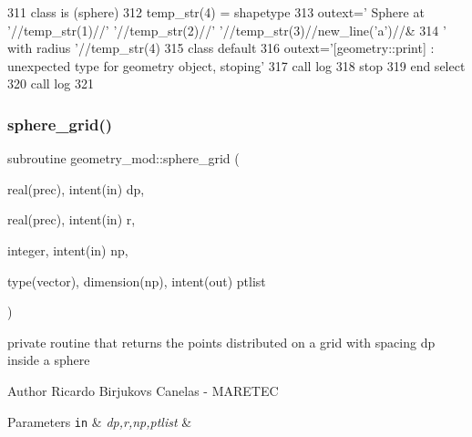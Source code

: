 \begin{DoxyCode}
311 \textcolor{keywordflow}{    class is} (sphere)
312         temp\_str(4) = shapetype%
313         outext=\textcolor{stringliteral}{'      Sphere at '}//temp\_str(1)//\textcolor{stringliteral}{' '}//temp\_str(2)//\textcolor{stringliteral}{' '}//temp\_str(3)//new\_line(\textcolor{stringliteral}{'a'})//&
314             \textcolor{stringliteral}{'       with radius '}//temp\_str(4)
315 \textcolor{keywordflow}{        class default}
316         outext=\textcolor{stringliteral}{'[geometry::print] : unexpected type for geometry object, stoping'}
317         \textcolor{keyword}{call }log%
318         stop
319 \textcolor{keywordflow}{    end select}
320     \textcolor{keyword}{call }log%
321 
\end{DoxyCode}
\mbox{\label{namespacegeometry__mod_a6c03a4ea3de6763940396dbeb3908ebc}} 
\subsubsection{\texorpdfstring{sphere\+\_\+grid()}{sphere\_grid()}}
{\footnotesize\ttfamily subroutine geometry\+\_\+mod\+::sphere\+\_\+grid (\begin{DoxyParamCaption}\item[{real(prec), intent(in)}]{dp,  }\item[{real(prec), intent(in)}]{r,  }\item[{integer, intent(in)}]{np,  }\item[{type(vector), dimension(np), intent(out)}]{ptlist }\end{DoxyParamCaption})\hspace{0.3cm}{\ttfamily [private]}}



private routine that returns the points distributed on a grid with spacing dp inside a sphere 

\begin{DoxyAuthor}{Author}
Ricardo Birjukovs Canelas -\/ M\+A\+R\+E\+T\+EC 
\end{DoxyAuthor}

\begin{DoxyParams}[1]{Parameters}
\mbox{\tt in}  & {\em dp,r,np,ptlist} & \\
\hline
\end{DoxyParams}


